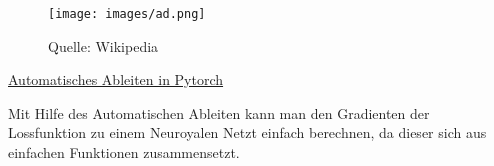 \begin{figure}[H]
      \centering
    \texttt{[image: images/ad.png]}
      \caption{Quelle: Wikipedia}
\end{figure}

\href{https://pytorch.org/tutorials/beginner/blitz/autograd_tutorial.html}{Automatisches Ableiten  in Pytorch}

Mit Hilfe des Automatischen Ableiten kann man den Gradienten der Lossfunktion zu einem Neuroyalen Netzt einfach berechnen, da dieser sich aus einfachen Funktionen zusammensetzt.






